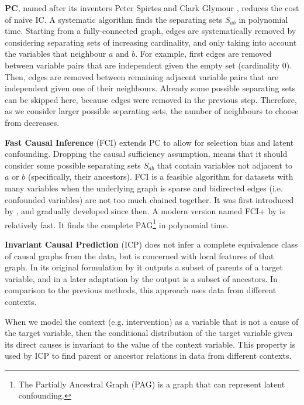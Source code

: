 \textbf{PC}, named after its inventers Peter Spirtes and Clark Glymour \citep{spirtes1991algorithm}, reduces the cost of naive IC. A systematic algorithm finds the separating sets $S_{ab}$ in polynomial time. Starting from a fully-connected graph, edges are systematically removed by considering separating sets of increasing cardinality, and only taking into account the variables that neighbour $a$ and $b$. For example, first edges are removed between variable pairs that are independent given the empty set (cardinality 0). Then, edges are removed between remaining adjacent variable pairs that are independent given one of their neighbours. Already some possible separating sets can be skipped here, because edges were removed in the previous step. Therefore, as we consider larger possible separating sets, the number of neighbours to choose from decreases.
            
\textbf{Fast Causal Inference} (FCI) extends PC to allow for selection bias and latent confounding. Dropping the causal sufficiency assumption, means that it should consider some possible separating sets $S_{ab}$ that contain variables not adjacent to $a$ or $b$ (specifically, their ancestors). FCI is a feasible algorithm for datasets with many variables when the underlying graph is sparse and bidirected edges (i.e. confounded variables) are not too much chained together. It was first introduced by \citet{spirtes1999algorithm}, and gradually developed since then. A modern version named FCI+ by \citet{claassen2013learning} is relatively fast. It finds the complete PAG\footnote{The Partially Ancestral Graph (PAG) is a graph that can represent latent confounding.} in polynomial time.
            
\textbf{Invariant Causal Prediction} (ICP) does not infer a complete equivalence class of causal graphs from the data, but is concerned with local features of that graph. In its original formulation by \citet{peters2016causal} it outputs a subset of parents of a target variable, and in a later adaptation by \citet{mooij2016joint} the output is a subset of ancestors. In comparison to the previous methods, this approach uses data from different contexts.

When we model the context (e.g. intervention) as a variable that is not a cause of the target variable, then the conditional distribution of the target variable given its direct causes is invariant to the value of the context variable. This property is used by ICP to find parent or ancestor relations in data from different contexts. 

